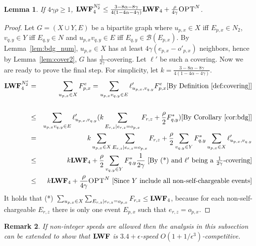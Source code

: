 \documentclass[11pt]{article}
\newtheorem{lemma}{Lemma}[section]
\newtheorem{remark}[lemma]{Remark}
\newcommand{\opt}{\textrm{\sc OPT}}
\newcommand{\eps}{\epsilon}
\newcommand{\len}{\mathfrak{\rho}}
\newcommand{\fe}{F^e}
\newcommand{\lwfnetwo}{\lwf^{N_2^e}}
\newcommand{\optn}{\opt^{N}}
\begin{document}
\begin{titlepage}
\begin{lemma}
    \label{lem:type2}
    If $4 \gamma \len \geq 1$, $\lwfnetwo_4 \leq \frac{3 - 8\alpha - 8\gamma}{4(1 - 4\alpha -
      4\gamma)} \lwf_4 + \frac{\len}{4\gamma} \optn$.
\end{lemma}
\begin{proof}
  Let $G=(X \cup Y,E)$ be a bipartite graph where $u_{p,x} \in
  X$ iff $E_{p,x} \in N_2$, $v_{q,y} \in Y$ iff $E_{q,y} \in N$ and
  $u_{p,x} v_{q,y} \in E$ iff $E_{q,y} \in \mathcal{B}(E_{p,x})$. By
  Lemma~\ref{lem:bdg_num}, $u_{p,x} \in X$ has at least $ 4\gamma
  (e_{p,x}-o'_{p,x})$ neighbors, hence by Lemma~\ref{lem:cover2}, $G$
  has $ \frac{1}{2\gamma}$-covering. Let $\ell'$ be such a covering.
  Now we are ready to prove the final step. For simplicity,
  let $k = \frac{3 - 8\alpha - 8\gamma}{4(1 - 4\alpha - 4\gamma)}$.
\begin{eqnarray*}
  \lwfnetwo_{4}
  &=   &  \sum_{u_{p,x} \in X} \fe_{p,x} = \sum_{u_{p,x}v_{q,y} \in E} \ell'_{u_{p,x},v_{q,y}} \fe_{p,x} \mbox{[By Definition~\ref{def:covering}]}  \\\\
  &\leq&  \sum_{u_{p,x}v_{q,y} \in E} \ell'_{u_{p,x},v_{q,y}} (k \sum_{E_{r,z} | e_{r,z} = o_{p,x}} F_{r,z} + \frac{\len}{2} F^*_{q,y})   \mbox{[By Corollary~\ref{cor:bdg}]}\\
  &=   &  k \sum_{u_{p,x} \in X} \sum_{E_{r,z}| e_{r,z} = o_{p,x}} F_{r,z} + \frac{\len}{2} \sum_{v_{q,y} \in Y} F^*_{q,y} \sum_{u_{p,x} \in X} \ell'_{u_{p,x},v_{q,y}} \\
  &\leq&  k \lwf_4 + \frac{\len}{2} \sum_{v_{q,y} \in Y} F^*_{q,y} \frac{1}{2\gamma}        \mbox{ [By (*) and $\ell'$ being a $\frac{1}{2\gamma}$-covering]}  \\
  &\leq&  k \lwf_4 + \frac{\len}{4\gamma} \optn      \mbox{ [Since $Y$ include all non-self-chargeable events]}  \\
\end{eqnarray*}
It holds that (*)~$\sum_{u_{p,x} \in X} \sum_{E_{r,z}|e_{r,z} = o_{p,x}} F_{r,z} \leq {\texttt{\bf{LWF}}}_4$, because for each
non-self-chargeable $E_{r,z}$ there is only one event $E_{p,x}$ such that $e_{r,z} = o_{p,x}$.
\end{proof}

\begin{remark}
  If non-integer speeds are allowed then the analysis in this
  subsection can be extended to show that ${\texttt{\bf{LWF}}}$ is ${3.4+ \eps}$-speed
  $O(1+1/\eps^3)$-competitive.
\end{remark}



\end{titlepage}
\end{document}
